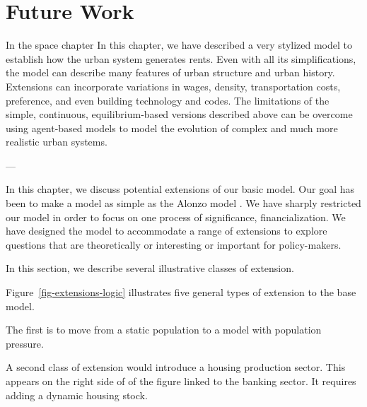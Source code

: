 \chapter[Future Work]{Future Work}
\label{appendix-future-work}


In the space chapter
In this chapter, we have described a very stylized model to  establish how the urban system generates rents. Even with all its simplifications, the model can describe many features of urban structure and urban history.   %
Extensions can incorporate variations in wages, density, transportation costs, preference, and even building technology and codes. The limitations of the simple, continuous, equilibrium-based versions described above can be overcome using agent-based models to model the evolution of complex and much more realistic urban systems. 




---

In  this chapter, we discuss potential extensions of our basic model. 
Our goal has been to make a model as simple as the Alonzo model \cite{alonsoLocationLandUse1964}. 
We have sharply restricted our model  in order to focus on one process of significance, financialization.  %
We have designed the model to  accommodate a range of extensions to explore questions that are theoretically or interesting or important for policy-makers. 

In this section, we describe several illustrative classes of extension. 


Figure~\ref{fig-extensions-logic} illustrates  five general types of extension to the base model. 

The first is to move from a static population to a model with population pressure. %

A second class of extension would introduce a housing production sector. This appears on the right side of of the figure linked to the banking sector. It requires adding a dynamic housing stock. 

